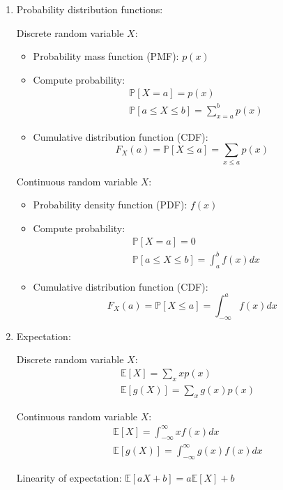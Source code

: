\documentclass{article}
\begin{document}
\begin{enumerate}
	\item Probability distribution functions:
		\vspace*{-0.5\baselineskip}
		\begin{multicols}{2}
			Discrete random variable $X$:
			\begin{itemize}
				\item Probability mass function (PMF): $p(x)$
				\item Compute probability:
					\begin{align*}
						&\mathbb{P}[X=a]=p(x) \\
						&\mathbb{P}[a\leq X\leq b]=\sum_{x=a}^{b}p(x)
					\end{align*}
				\item Cumulative distribution function (CDF):
					$$F_X(a)=\mathbb{P}[X\leq a]=\sum_{x\leq a}p(x)$$
			\end{itemize}
			
			\columnbreak
			Continuous random variable $X$:
			\begin{itemize}
				\item Probability density function (PDF): $f(x)$
				\item Compute probability:
					\begin{align*}
						&\mathbb{P}[X=a]=0 \\
						&\mathbb{P}[a\leq X\leq b]=\int_{a}^{b}f(x)dx
					\end{align*}
				\item Cumulative distribution function (CDF):
					$$F_X(a)=\mathbb{P}[X\leq a]=\int_{-\infty}^{a}f(x)dx$$
			\end{itemize}
		\end{multicols}
		
	\vspace*{-\baselineskip}
	\item Expectation:
		\vspace*{-0.5\baselineskip}
		\begin{multicols}{2}
			Discrete random variable $X$:
			\begin{align*}
				&\mathbb{E}[X]=\sum_x xp(x) \\
				&\mathbb{E}[g(X)]=\sum_x g(x)p(x)
			\end{align*}
			
			\columnbreak
			Continuous random variable $X$:
			\begin{align*}
				&\mathbb{E}[X]=\int_{-\infty}^{\infty} xf(x)dx \\
				&\mathbb{E}[g(X)]=\int_{-\infty}^{\infty} g(x)f(x)dx
			\end{align*}
		\end{multicols}
		\vspace*{-0.5\baselineskip}
		Linearity of expectation: $\mathbb{E}[aX+b]=a\mathbb{E}[X]+b$
		

\end{enumerate}
\end{document}

